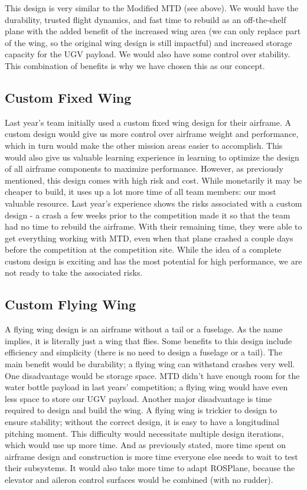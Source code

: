 \documentclass[]{auvsi_doc}
\begin{document}
This design is very similar to the Modified MTD (see above). We would have the durability, trusted flight dynamics, and fast time to rebuild as an off-the-shelf plane with the added benefit of the increased wing area (we can only replace part of the wing, so the original wing design is still impactful) and increased storage capacity for the UGV payload. We would also have some control over stability. This combination of benefits is why we have chosen this as our concept.

\subsection{Custom Fixed Wing}

Last year's team initially used a custom fixed wing design for their airframe. A custom design would give us more control over airframe weight and performance, which in turn would make the other mission areas easier to accomplish. This would also give us valuable learning experience in learning to optimize the design of all airframe components to maximize performance. However, as previously mentioned, this design comes with high risk and cost. While monetarily it may be cheaper to build, it uses up a lot more time of all team members: our most valuable resource. Last year's experience shows the risks associated with a custom design - a crash a few weeks prior to the competition made it so that the team had no time to rebuild the airframe. With their remaining time, they were able to get everything working with MTD, even when that plane crashed a couple days before the competition at the competition site. While the idea of a complete custom design is exciting and has the most potential for high performance, we are not ready to take the associated risks.

\subsection{Custom Flying Wing}
	
A flying wing design is an airframe without a tail or a fuselage. As the name implies, it is literally just a wing that flies. Some benefits to this design include efficiency and simplicity (there is no need to design a fuselage or a tail). The main benefit would be durability; a flying wing can withstand crashes very well. One disadvantage would be storage space. MTD didn't have enough room for the water bottle payload in last years' competition; a flying wing would have even less space to store our UGV payload. Another major disadvantage is time required to design and build the wing. A flying wing is trickier to design to ensure stability; without the correct design, it is easy to have a longitudinal pitching moment. This difficulty would necessitate multiple design iterations, which would use up more time. And as previously stated, more time spent on airframe design and construction is more time everyone else needs to wait to test their subsystems. It would also take more time to adapt ROSPlane, because the elevator and aileron control surfaces would be combined (with no rudder).
\end{document}
